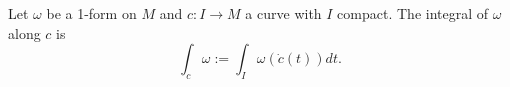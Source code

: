 Let $\omega$ be a 1-form on $M$ and $c: I \to M$ a curve with $I$ compact. The integral of $\omega$ along $c$ is
$$\int_c \omega := \int_I \omega(\dot{c}(t)) dt.$$